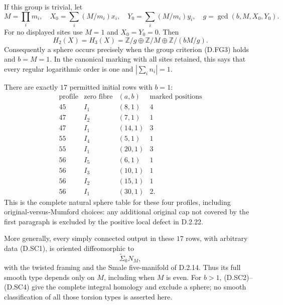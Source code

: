 If this group is trivial, let
\[
 M=\prod_i m_i,\quad
 X_0=\sum_i(M/m_i)x_i,\quad Y_0=\sum_i(M/m_i)y_i,\quad
 g=\gcd(b,M,X_0,Y_0).
\]
For no displayed sites use $M=1$ and $X_0=Y_0=0$.
Then
\[
 H_2(X)=H_3(X)=
 \mathbb Z/g\oplus\mathbb Z/M\oplus\mathbb Z/(bM/g).          \tag{D.SC4}
\]
Consequently a sphere occurs precisely when the group criterion
(D.FG3) holds and $b=M=1$. In the canonical marking with all sites
retained, this says that every regular logarithmic order is one and
$|\sum_i n_i|=1$.

There are exactly $17$ permitted initial rows with $b=1$:
\[
\begin{array}{c|c|c|c}
 \text{profile}&\text{zero fibre}&(a,b)&\text{marked positions}\\\hline
 45&I_1&(8,1)&4\\
 47&I_2&(7,1)&1\\
 47&I_1&(14,1)&3\\
 55&I_4&(5,1)&1\\
 55&I_1&(20,1)&3\\
 56&I_5&(6,1)&1\\
 56&I_3&(10,1)&1\\
 56&I_2&(15,1)&1\\
 56&I_1&(30,1)&2.
\end{array}                                                 \tag{D.SC5}
\]
This is the complete natural sphere table for these four profiles,
including original-versus-Mumford choices: any additional original
cap not covered by the first paragraph is excluded by the positive
local defect in D.2.22.

More generally, every simply connected output in these $17$ rows,
with arbitrary data (D.SC1), is oriented diffeomorphic to
\[
                              \widetilde\Sigma_0N_M,         \tag{D.SC6}
\]
with the twisted framing and the Smale five-manifold of D.2.14.
Thus its full smooth type depends only on $M$, including when $M$
is even. For $b>1$, (D.SC2)--(D.SC4) give the complete integral
homology and exclude a sphere; no smooth classification of all
those torsion types is asserted here.

